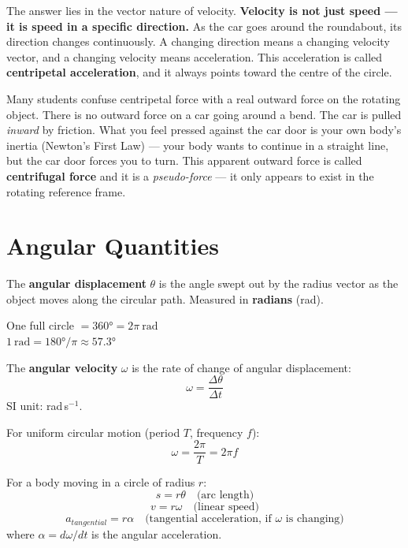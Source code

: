 The answer lies in the vector nature of velocity.
\textbf{Velocity is not just speed --- it is speed in
a specific direction.} As the car goes around the
roundabout, its direction changes continuously. A
changing direction means a changing velocity vector,
and a changing velocity means acceleration. This
acceleration is called \textbf{centripetal acceleration},
and it always points toward the centre of the circle.

\begin{misconceptionbox}
Many students confuse centripetal force with a real
outward force on the rotating object. There is no
outward force on a car going around a bend. The car
is pulled \textit{inward} by friction. What you feel
pressed against the car door is your own body's
inertia (Newton's First Law) --- your body wants to
continue in a straight line, but the car door forces
you to turn. This apparent outward force is called
\textbf{centrifugal force} and it is a \textit{pseudo-force}
--- it only appears to exist in the rotating reference
frame.
\end{misconceptionbox}

\section{Angular Quantities}

\begin{definitionbox}
The \textbf{angular displacement} $\theta$ is the angle
swept out by the radius vector as the object moves along
the circular path. Measured in \textbf{radians} (rad).

One full circle $= 360° = 2\pi\ \text{rad}$\\
$1\ \text{rad} = 180°/\pi \approx 57.3°$
\end{definitionbox}

\begin{definitionbox}
The \textbf{angular velocity} $\omega$ is the rate of
change of angular displacement:
\[
  \omega = \frac{\Delta\theta}{\Delta t}
\]
SI unit: rad\,s$^{-1}$.

For uniform circular motion (period $T$, frequency $f$):
\[
  \omega = \frac{2\pi}{T} = 2\pi f
\]
\end{definitionbox}

\begin{definitionbox}
For a body moving in a circle of radius $r$:
\[
  s = r\theta \quad \text{(arc length)}
\]
\[
  v = r\omega \quad \text{(linear speed)}
\]
\[
  a_{tangential} = r\alpha \quad
  \text{(tangential acceleration, if } \omega
  \text{ is changing)}
\]
where $\alpha = d\omega/dt$ is the angular acceleration.
\end{definitionbox}

